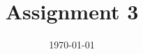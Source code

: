 \documentclass[a4paper]{article}
\date{\today}
\title{Assignment 3}
\newcommand{\T}{\top}
\newcommand{\expdist}[2]{%
        \normalfont{\textsc{Exp}}(#1, #2)%
    }
\newcommand{\expparam}{\bm \lambda}
\newcommand{\natparam}{\bm \eta}
\newcommand{\sufstat}{\bm u}
\begin{document}
    \header{}



    
\end{document}
